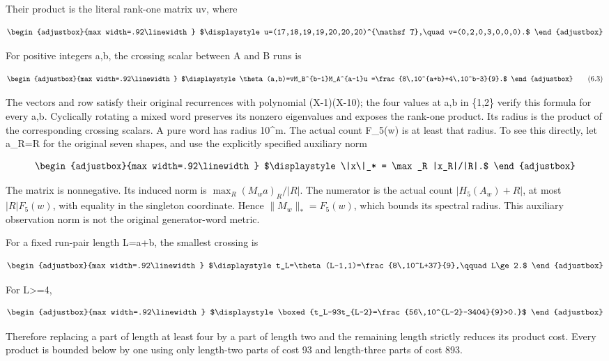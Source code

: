 Their product is the literal rank-one matrix uv, where

\[
\begin{adjustbox}{max width=.92\linewidth}
$\displaystyle u=(17,18,19,19,20,20,20)^{\mathsf T},\quad
 v=(0,2,0,3,0,0,0).$
\end{adjustbox}
\]

For positive integers a,b, the crossing scalar between A and B runs is

\[
\begin{adjustbox}{max width=.92\linewidth}
$\displaystyle \theta(a,b)=vM_B^{b-1}M_A^{a-1}u
 =\frac{8\,10^{a+b}+4\,10^b-3}{9}.$
\end{adjustbox}
\tag{6.3}
\]

The vectors and row satisfy their original recurrences with polynomial (X-1)(X-10); the four values at a,b in \{1,2\} verify this formula for every a,b. Cyclically rotating a mixed word preserves its nonzero eigenvalues and exposes the rank-one product. Its radius is the product of the corresponding crossing scalars. A pure word has radius 10\^{}m. The actual count F\_5(w) is at least that radius. To see this directly, let a\_R=\textbar R\textbar{} for the original seven shapes, and use the explicitly specified auxiliary norm

\[
\begin{adjustbox}{max width=.92\linewidth}
$\displaystyle \|x\|_* = \max_R |x_R|/|R|.$
\end{adjustbox}
\]

The matrix is nonnegative. Its induced norm is \(\max_R(M_w a)_R/|R|\). The numerator is the actual count \(|H_5(A_w)+R|\), at most \(|R|F_5(w)\), with equality in the singleton coordinate. Hence \(\|M_w\|_*=F_5(w)\), which bounds its spectral radius. This auxiliary observation norm is not the original generator-word metric.

For a fixed run-pair length L=a+b, the smallest crossing is

\[
\begin{adjustbox}{max width=.92\linewidth}
$\displaystyle t_L=\theta(L-1,1)=\frac{8\,10^L+37}{9},\qquad L\ge2.$
\end{adjustbox}
\]

For L\textgreater=4,

\[
\begin{adjustbox}{max width=.92\linewidth}
$\displaystyle \boxed{t_L-93t_{L-2}=\frac{56\,10^{L-2}-3404}{9}>0.}$
\end{adjustbox}
\]

Therefore replacing a part of length at least four by a part of length two and the remaining length strictly reduces its product cost. Every product is bounded below by one using only length-two parts of cost 93 and length-three parts of cost 893.

